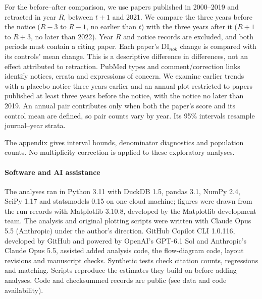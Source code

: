 For the before--after comparison, we use papers published in 2000--2019 and retracted in year $R$, between $t+1$
and 2021. We compare the three years before the notice ($R-3$ to $R-1$, no earlier than $t$) with the three years
after it ($R+1$ to $R+3$, no later than 2022). Year $R$ and notice records are excluded, and both periods must
contain a citing paper. Each paper's DI$_{nok}$ change is compared with its controls' mean change.
This is a descriptive difference in differences, not an effect attributed to retraction.
PubMed types and comment/correction links identify notices, errata and expressions of concern.
We examine earlier trends with a placebo notice three years earlier and an annual plot restricted to papers
published at least three years before the notice, with the notice no later than 2019.
An annual pair contributes only when both the paper's score and its control mean are defined, so pair counts
vary by year. Its 95\% intervals resample journal--year strata.

The appendix gives interval bounds, denominator diagnostics and population counts.
No multiplicity correction is applied to these exploratory analyses.

\paragraph{Software and AI assistance} The analyses ran in Python 3.11 with DuckDB 1.5, pandas 3.1, NumPy 2.4, SciPy
1.17 and statsmodels 0.15 on one cloud machine; figures were drawn from the run records with Matplotlib 3.10.8,
developed by the Matplotlib development team. The
analysis and original plotting scripts were written with Claude Opus 5.5 (Anthropic) under the author's direction.
GitHub Copilot CLI 1.0.116, developed by GitHub and powered by OpenAI's GPT-6.1 Sol and Anthropic's
Claude Opus 5.5, assisted added analysis code, the flow-diagram code, layout revisions and manuscript checks. Synthetic tests check citation counts,
regressions and matching. Scripts reproduce the estimates they build on before adding analyses.
Code and checksummed records are public (see data and code availability).
